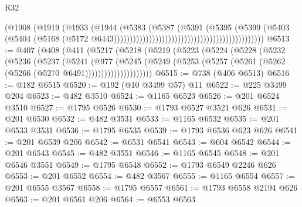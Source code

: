 \begin{lexlean}{R32}
\begin{coremodule}
                                                                        (@1908
                                                                          (@1919
                                                                            (@1933
                                                                              (@1944
                                                                                (@5383
                                                                                  (@5387
                                                                                    (@5391
                                                                                      (@5395
                                                                                        (@5399
                                                                                          (@5403
                                                                                            (@5404
                                                                                              (@5168
                                                                                                (@5172
                                                                                                  @6443)))))))))))))))))))))))))))))))))))))))))))))))
@6513 := @407
    (@408
      (@411
        (@5217
          (@5218
            (@5219
              (@5223
                (@5224
                  (@5228
                    (@5232
                      (@5236
                        (@5237
                          (@5241
                            (@977
                              (@5245
                                (@5249
                                  (@5253
                                    (@5257 (@5261 (@5262 (@5266 (@5270 @6491)))))))))))))))))))))
@6515 := @738 (@406 @6513)
@6516 := @182 @6515
@6520 := @192 (@10 @3499 @57) @11
@6522 := @225 @3499 @204
@6523 := @482 @3510
@6524 := @1165 @6523
@6526 := @201 @6524 @3510
@6527 := @1795 @6526
@6530 := @1793 @6527 @3521 @626
@6531 := @201 @6530
@6532 := @482 @3531
@6533 := @1165 @6532
@6535 := @201 @6533 @3531
@6536 := @1795 @6535
@6539 := @1793 @6536 @623 @626
@6541 := @201 @6539 @206
@6542 := @6531 @6541
@6543 := @604 @6542
@6544 := @201 @6543
@6545 := @482 @3551
@6546 := @1165 @6545
@6548 := @201 @6546 @3551
@6549 := @1795 @6548
@6552 := @1793 @6549 @2246 @626
@6553 := @201 @6552
@6554 := @482 @3567
@6555 := @1165 @6554
@6557 := @201 @6555 @3567
@6558 := @1795 @6557
@6561 := @1793 @6558 @2194 @626
@6563 := @201 @6561 @206
@6564 := @6553 @6563

\end{coremodule}
\end{lexlean}
